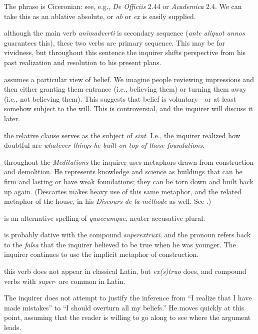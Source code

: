  The phrase is Ciceronian: see, e.g., \textit{De Officiis} 2.44 or \textit{Academica} 2.4. We can take this as an ablative absolute, or \textit{ab} or \textit{ex} is easily supplied.

 although the main verb \textit{animadverti} is secondary sequence (\textit{ante aliquot annos} guarantees this), these two verbs are primary sequence. This may be for vividness, but throughout this sentence the inquirer shifts perspective from his past realization and resolution to his present plans.

 assumes a particular view of belief. We imagine people reviewing impressions and then either granting them entrance (i.e., believing them) or turning them away (i.e., not believing them). This suggests that belief is voluntary---or at least somehow subject to the will. This is controversial, and the inquirer will discuss it later.

 the relative clause serves as the subject of \textit{sint}. I.e., the inquirer realized how doubtful are \textit{whatever things he built on top of those foundations}.

 throughout the \textit{Meditations} the inquirer uses metaphors drawn from construction and demolition. He represents knowledge and science as buildings that can be firm and lasting or have weak foundations; they can be torn down and built back up again. (Descartes makes heavy use of this same metaphor, and the related metaphor of the house, in his \textit{Discours de la méthode} as well. See \cite[22]{curtis1984}.)

 is an alternative spelling of \textit{quaecumque}, neuter accusative plural.

 is probably dative with the compound \textit{superextruxi}, and the pronoun refers back to the \textit{falsa} that the inquirer believed to be true when he was younger. The inquirer continues to use the implicit metaphor of construction.

 this verb does not appear in classical Latin, but \textit{ex(s)truo} does, and compound verbs with \textit{super}- are common in Latin.

 The inquirer does not attempt to justify the inference from ``I realize that I have made mistakes'' to ``I should overturn all my beliefs.'' He moves quickly at this point, assuming that the reader is willing to go along to see where the argument leads. 

